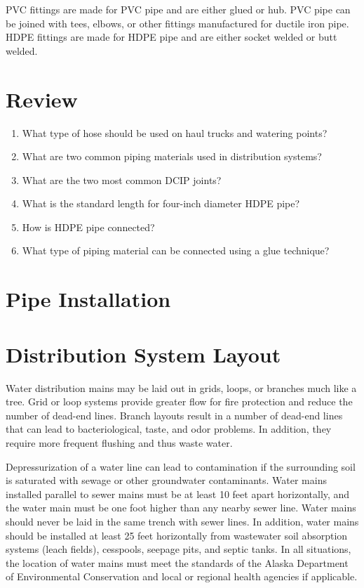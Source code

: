\documentclass[10pt]{article}
\begin{document}
PVC fittings are made for PVC pipe and are either glued or hub. PVC pipe can be joined with tees, elbows, or other fittings manufactured for ductile iron pipe. HDPE fittings are made for HDPE pipe and are either socket welded or butt welded.

\section{Review}
\begin{enumerate}
  \item What type of hose should be used on haul trucks and watering points?

  \item What are two common piping materials used in distribution systems?

  \item What are the two most common DCIP joints?

  \item What is the standard length for four-inch diameter HDPE pipe?

  \item How is HDPE pipe connected?

  \item What type of piping material can be connected using a glue technique?

\end{enumerate}
\section{Pipe Installation}
\section{Distribution System Layout}
Water distribution mains may be laid out in grids, loops, or branches much like a tree. Grid or loop systems provide greater flow for fire protection and reduce the number of dead-end lines. Branch layouts result in a number of dead-end lines that can lead to bacteriological, taste, and odor problems. In addition, they require more frequent flushing and thus waste water.

Depressurization of a water line can lead to contamination if the surrounding soil is saturated with sewage or other groundwater contaminants. Water mains installed parallel to sewer mains must be at least 10 feet apart horizontally, and the water main must be one foot higher than any nearby sewer line. Water mains should never be laid in the same trench with sewer lines. In addition, water mains should be installed at least 25 feet horizontally from wastewater soil absorption systems (leach fields), cesspools, seepage pits, and septic tanks. In all situations, the location of water mains must meet the standards of the Alaska Department of Environmental Conservation and local or regional health agencies if applicable.
\end{document}
